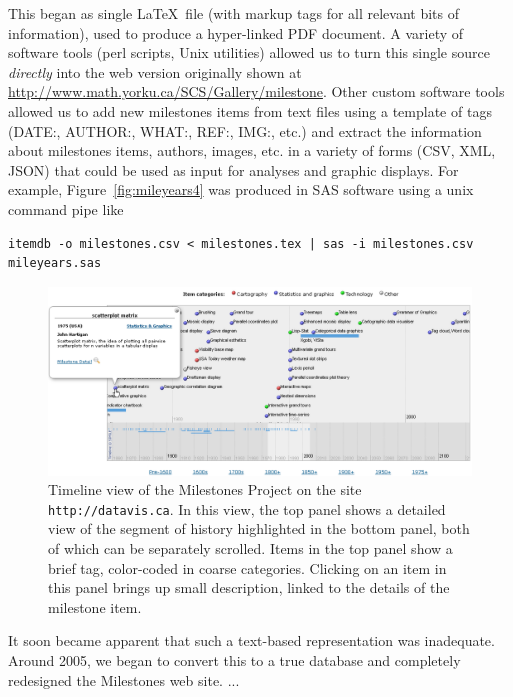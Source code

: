 \documentclass[11pt]{article}
\newcommand*{\figref}[1]{Figure~\ref{#1}}
\begin{document}
This began as single \LaTeX\ file (with markup tags for all relevant bits of information),
used to produce a
hyper-linked PDF document.  A variety of software tools (perl scripts, Unix utilities) allowed us to turn this
single source
\emph{directly} into the web version originally shown at
\url{http://www.math.yorku.ca/SCS/Gallery/milestone}.  Other custom software tools allowed us to
add new milestones items from text files using a template of tags (DATE:, AUTHOR:, WHAT:, REF:, IMG:, etc.)
and extract the
information about milestones items, authors, images, etc. in a variety of forms (CSV, XML, JSON)
that could be used as input for analyses and graphic displays.  For example, \figref{fig:mileyears4}
was produced in SAS software using a unix command pipe like
\begin{verbatim}
itemdb -o milestones.csv < milestones.tex | sas -i milestones.csv mileyears.sas
\end{verbatim}

\begin{figure}[!htb]
  \centering
  \includegraphics[width=\textwidth,clip]{fig/datavis-timeline2}
  \caption{Timeline view of the Milestones Project on the site \texttt{http://datavis.ca}. In this view,
  the top panel shows a detailed view of the segment of history highlighted in the bottom panel, both
  of which can be separately scrolled. Items in the top panel show a brief tag, color-coded in coarse
  categories. Clicking on an item in this panel brings up small description, linked to the details of
  the milestone item.
  }
  \label{fig:datavis-timeline2}
\end{figure}

It soon became apparent that such a text-based representation was inadequate.  Around 2005, we began
to convert this to a true database and
completely redesigned the Milestones web site. ...
\end{document}
